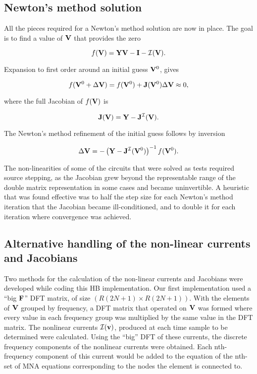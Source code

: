 \subsection{Newton's method solution}

All the pieces required for a Newton's method solution are now in place.
The goal is to find a value of \( \mathbf{V} \) that provides the zero

\begin{dmath}\label{eqn:ece1254projectReport:1220}
f(\BV) = \BY \BV - \BI - \mathcal{I}(\BV).
\end{dmath}

Expansion to first order around an initial guess \( \mathbf{V}^0 \), gives

\begin{dmath}\label{eqn:ece1254projectReport:1240}
f( \BV^0 + \Delta \BV ) = f(\BV^0) + \BJ(\BV^0) \Delta \BV \approx 0,
\end{dmath}

where the full Jacobian of \( f(\mathbf{V}) \) is

\begin{dmath}\label{eqn:ece1254projectReport:1260}
\BJ(\BV) = \BY - \BJ^{\mathcal{I}}(\BV).
\end{dmath}

The Newton's method refinement of the initial guess follows by inversion

\begin{dmath}\label{eqn:ece1254projectReport:1280}
\Delta \BV = -\lr{ \BY - \BJ^{\mathcal{I}}(\BV^0) }^{-1} f(\BV^0).
\end{dmath}

The non-linearities of some of the circuits that were solved as tests required source stepping, as the Jacobian grew beyond the representable range of the double matrix representation in some cases and became uninvertible.
A heuristic that was found effective was to half the step size for each Newton's method iteration that the Jacobian became ill-conditioned, and to double it for each iteration where convergence was achieved.

\subsection{Alternative handling of the non-linear currents and Jacobians}

Two methods for the calculation of the non-linear currents and Jacobians were developed while coding this HB implementation.
Our first implementation used
a ``big \( \mathbf{F} \)'' DFT matrix, of size \( ( R (2 N + 1 ) \times R (2 N + 1) ) \).
With the elements of \( \mathbf{V} \) grouped by frequency, a DFT matrix that operated on \( \mathbf{V} \) was formed where
every value in each frequency group was multiplied by the same value in the DFT matrix.
The nonlinear currents \( \mathcal{I}(\mathbf{v}) \), produced at each time sample to be determined were calculated.
Using the
``big'' DFT of these currents, the discrete frequency
components of the nonlinear currents were obtained.
Each nth-frequency component of this current would be added
to the equation of the nth-set of MNA equations corresponding to the nodes the element is connected
to.

